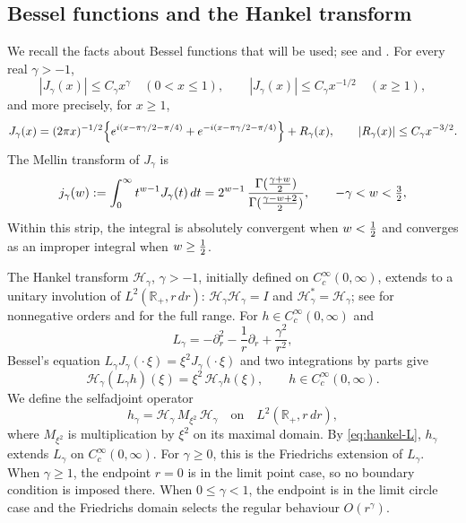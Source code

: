 \documentclass[11pt,a4paper,reqno,backref=page]{amsart}
\newcommand{\R}{\mathbb R}
\newcommand{\HH}{\mathcal H}                 %
\newcommand{\dd}{\,d}
\let\Re\relax\DeclareMathOperator{\Re}{Re}
\newcommand{\Gam}[2]{\frac{\Gamma(#1)}{\Gamma(#2)}}
\newcommand{\coloneq}{:=}
\numberwithin{equation}{section}
\theoremstyle{definition}
\theoremstyle{remark}
\begin{document}
\subsection{Bessel functions and the Hankel transform}

We recall the facts about Bessel functions that will be used;
see \cite[Ch.~10]{NIST} and \cite{Watson1944}. For every real
$\gamma>-1$,
\begin{equation}\label{eq:bessel-bounds}
  |J_\gamma(x)|\le C_\gamma x^\gamma\quad(0<x\le1),\qquad
  |J_\gamma(x)|\le C_\gamma x^{-1/2}\quad(x\ge1),
\end{equation}
and more precisely, for $x\ge1$,
\begin{equation}\label{eq:bessel-asym}
  J_\gamma(x)=(2\pi x)^{-1/2}
  \Bigl\{e^{i(x-\pi\gamma/2-\pi/4)}
    +e^{-i(x-\pi\gamma/2-\pi/4)}\Bigr\}
  +R_\gamma(x),\qquad |R_\gamma(x)|\le C_\gamma x^{-3/2}.
\end{equation}
The Mellin transform of $J_\gamma$ is \cite[Eq.~10.22.43]{NIST}
\begin{equation}\label{eq:bessel-mellin}
  j_\gamma(w)\coloneq\int_0^\infty t^{w-1}J_\gamma(t)\dd t
  =2^{w-1}\,\Gam{\frac{\gamma+w}{2}}
    {\frac{\gamma-w+2}{2}},\qquad
  -\gamma<\Re w<\tfrac32,
\end{equation}
Within this strip, the integral is absolutely convergent when
$\Re w<\frac12$ and converges as an improper integral when $\Re
w\ge\frac12$.

The Hankel transform $\HH_\gamma$, $\gamma>-1$, initially
defined on $C_c^\infty(0,\infty)$, extends to a unitary
involution of $L^2(\R_+,r\,dr)$: $\HH_\gamma\HH_\gamma=I$ and
$\HH_\gamma^*=\HH_\gamma$; see \cite[\S8.18]{Titchmarsh1948} for
nonnegative orders and
\cite[Propositions~4.5--4.6]{DerezinskiRichard2017} for the full
range. For $h\in C_c^\infty(0,\infty)$ and
\begin{equation}\label{eq:Lgamma}
  L_\gamma=-\partial_r^2-\frac1r\partial_r+\frac{\gamma^2}{r^2},
\end{equation}
Bessel's equation $L_\gamma
J_\gamma(\cdot\,\xi)=\xi^2J_\gamma(\cdot\,\xi)$ and two
integrations by parts give
\begin{equation}\label{eq:hankel-L}
  \HH_\gamma(L_\gamma h)(\xi)=\xi^2\,\HH_\gamma h(\xi),\qquad
  h\in C_c^\infty(0,\infty).
\end{equation}
We define the selfadjoint operator
\begin{equation}\label{eq:hgamma}
  h_\gamma=\HH_\gamma\,M_{\xi^2}\,\HH_\gamma
  \quad\text{on}\quad L^2(\R_+,r\,dr),
\end{equation}
where $M_{\xi^2}$ is multiplication by $\xi^2$ on its maximal
domain. By \eqref{eq:hankel-L}, $h_\gamma$ extends $L_\gamma$ on
$C_c^\infty(0,\infty)$. For $\gamma\ge0$, this is the
Friedrichs extension of $L_\gamma$. When $\gamma\ge1$, the
endpoint $r=0$ is in the limit point case, so no boundary
condition is imposed there. When $0\le\gamma<1$, the endpoint
is in the limit circle case and the Friedrichs domain selects
the regular behaviour $O(r^\gamma)$.
\end{document}
